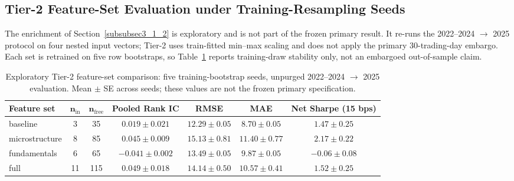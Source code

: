 \documentclass[pdflatex,sn-mathphys-num]{sn-jnl}
\theoremstyle{thmstyleone}
\theoremstyle{thmstyletwo}
\theoremstyle{thmstylethree}
\begin{document}
\iffalse
\subsection{Tier-2 Feature-Set Evaluation under Training-Resampling Seeds}\label{subsec4_tier2}

The enrichment of Section~\ref{subsubsec3_1_2} is exploratory and is not part of the frozen primary result. It re-runs the 2022--2024 $\rightarrow$ 2025 protocol on four nested input vectors; Tier-2 uses train-fitted min--max scaling and does not apply the primary 30-trading-day embargo. Each set is retrained on five row bootstraps, so Table~\ref{tab:tier2_features} reports training-draw stability only, not an embargoed out-of-sample claim.

\begin{table}[htbp]
\centering
\small
\caption{Exploratory Tier-2 feature-set comparison: five training-bootstrap seeds, unpurged 2022--2024 $\rightarrow$ 2025 evaluation. Mean $\pm$ SE across seeds; these values are not the frozen primary specification.}
\label{tab:tier2_features}
\begin{tabular}{@{}lcccccc@{}}
\toprule
\textbf{Feature set} & $\boldsymbol{n_{\mathrm{in}}}$ & $\boldsymbol{n_{\mathrm{free}}}$ & \textbf{Pooled Rank IC} & \textbf{RMSE} & \textbf{MAE} & \textbf{Net Sharpe (15 bps)} \\
\midrule
baseline          & 3  & 35  & $0.019 \pm 0.021$   & $12.29 \pm 0.05$ & $8.70 \pm 0.05$ & $1.47 \pm 0.25$ \\
microstructure    & 8  & 85  & $0.045 \pm 0.009$   & $15.13 \pm 0.81$ & $11.40 \pm 0.77$ & $\mathbf{2.17 \pm 0.22}$ \\
fundamentals      & 6  & 65  & $-0.041 \pm 0.002$  & $13.49 \pm 0.05$ & $9.87 \pm 0.05$ & $-0.06 \pm 0.08$ \\
full              & 11 & 115 & $\mathbf{0.049 \pm 0.018}$   & $14.14 \pm 0.50$ & $10.57 \pm 0.41$ & $1.52 \pm 0.25$ \\
\bottomrule
\end{tabular}
\end{table}
\end{document}
